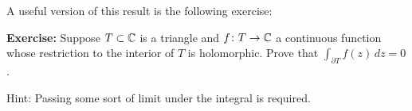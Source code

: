 \documentclass[10pt,aspectratio=169]{beamer}
\begin{document}
\begin{frame}
A useful version of this result is the following exercise:

\medskip

\textbf{Exercise:}
Suppose $T \subset {\mathbb{C}}$ is a triangle and $f \colon T \to {\mathbb{C}}$ a
continuous function whose restriction to the interior of $T$ is holomorphic.
Prove that $\int_{\partial T} f(z) \, dz = 0$.

\medskip
\pause

Hint: Passing some sort of limit under the integral is required.

\end{frame}
\end{document}
